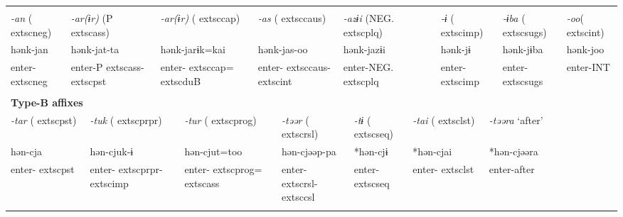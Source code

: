\tabletail{}
\tablelasttail{}
\begin{tabularx}{\textwidth}{XXXXXXXXXXXXXXXXXXXXXX}
\lsptoprule
\multicolumn{22}{X}{{\bfseries Type-A affixes}}\\
{ \textit{{}-an} (	extsc{neg})} & \multicolumn{4}{X}{{ \textit{{}-ar(ɨr)} (P	extsc{ass})}} & \multicolumn{4}{X}{{ \textit{{}-ar(ɨr)} (	extsc{cap})}} & \multicolumn{4}{X}{{ \textit{{}-as} (	extsc{caus})}} & \multicolumn{5}{X}{{ \textit{{}-azɨi} (NEG.	extsc{plq})}} & \multicolumn{2}{X}{{ \textit{{}-ɨ} (	extsc{imp})}} & { \textit{{}-ɨba} (	extsc{sugs})} & { \textit{{}-oo}(	extsc{int})}\\
hənk-jan & \multicolumn{4}{X}{hənk-jat-ta} & \multicolumn{4}{X}{hənk-jarɨk=kai} & \multicolumn{4}{X}{hənk-jas-oo} & \multicolumn{5}{X}{hənk-jazɨi} & \multicolumn{2}{X}{hənk-jɨ} & hənk-jɨba & hənk-joo\\
enter-	extsc{neg} & \multicolumn{4}{X}{enter-P	extsc{ass}-	extsc{pst}} & \multicolumn{4}{X}{enter-	extsc{cap}=	extsc{du}B} & \multicolumn{4}{X}{enter-	extsc{caus}-	extsc{int}} & \multicolumn{5}{X}{enter-NEG.	extsc{plq}} & \multicolumn{2}{X}{enter-	extsc{imp}} & enter-	extsc{sugs} & enter-INT\\
\multicolumn{22}{X}{}\\
\multicolumn{22}{X}{{\bfseries Type-B affixes}}\\
\multicolumn{2}{X}{{ \textit{{}-tar} (	extsc{pst})}} & \multicolumn{4}{X}{{ \textit{{}-tuk} (	extsc{prpr})}} & \multicolumn{4}{X}{{ \textit{{}-tur} (	extsc{prog})}} & \multicolumn{4}{X}{{ \textit{{}-təər} (	extsc{rsl})}} & \multicolumn{3}{X}{{ \textit{{}-tɨ} (	extsc{seq})}} & \multicolumn{2}{X}{{ \textit{{}-tai} (	extsc{lst})}} & \multicolumn{3}{X}{{ \textit{{}-təəra} ‘after’}}\\
\multicolumn{2}{X}{{ hən-cja}} & \multicolumn{4}{X}{{ hən-cjuk-ɨ}} & \multicolumn{4}{X}{{ hən-cjut=too}} & \multicolumn{4}{X}{{ hən-cjəəp-pa}} & \multicolumn{3}{X}{{ *hən-cjɨ}} & \multicolumn{2}{X}{{ *hən-cjai}} & \multicolumn{3}{X}{{ *hən-cjəəra}}\\
\multicolumn{2}{X}{enter-	extsc{pst}} & \multicolumn{4}{X}{enter-	extsc{prpr}-	extsc{imp}} & \multicolumn{4}{X}{enter-	extsc{prog}=	extsc{ass}} & \multicolumn{4}{X}{enter-	extsc{rsl}-	extsc{csl}} & \multicolumn{3}{X}{enter-	extsc{seq}} & \multicolumn{2}{X}{enter-	extsc{lst}} & \multicolumn{3}{X}{{ enter-after}}\\
\multicolumn{2}{X}{} & \multicolumn{4}{X}{} & \multicolumn{4}{X}{} & \multicolumn{4}{X}{} & \multicolumn{3}{X}{} & \multicolumn{2}{X}{} & \multicolumn{3}{X}{}\\

\end{tabularx}
